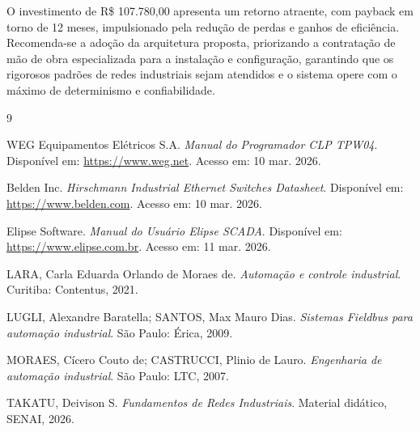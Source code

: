 \documentclass[12pt,a4paper]{article}
\begin{document}
O investimento de R\$ 107.780,00 apresenta um retorno atraente, com payback em torno de 12 meses, impulsionado pela redução de perdas e ganhos de eficiência. Recomenda-se a adoção da arquitetura proposta, priorizando a contratação de mão de obra especializada para a instalação e configuração, garantindo que os rigorosos padrões de redes industriais sejam atendidos e o sistema opere com o máximo de determinismo e confiabilidade.

\begin{thebibliography}{9}

 WEG Equipamentos Elétricos S.A. \textit{Manual do Programador CLP TPW04}. Disponível em: \url{https://www.weg.net}. Acesso em: 10 mar. 2026.

 Belden Inc. \textit{Hirschmann Industrial Ethernet Switches Datasheet}. Disponível em: \url{https://www.belden.com}. Acesso em: 10 mar. 2026.

 Elipse Software. \textit{Manual do Usuário Elipse SCADA}. Disponível em: \url{https://www.elipse.com.br}. Acesso em: 11 mar. 2026.

 LARA, Carla Eduarda Orlando de Moraes de. \textit{Automação e controle industrial}. Curitiba: Contentus, 2021.

 LUGLI, Alexandre Baratella; SANTOS, Max Mauro Dias. \textit{Sistemas Fieldbus para automação industrial}. São Paulo: Érica, 2009.

 MORAES, Cícero Couto de; CASTRUCCI, Plinio de Lauro. \textit{Engenharia de automação industrial}. São Paulo: LTC, 2007.

 TAKATU, Deivison S. \textit{Fundamentos de Redes Industriais}. Material didático, SENAI, 2026.

\end{thebibliography}
\end{document}

